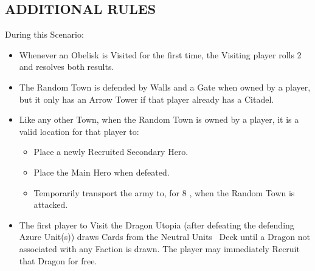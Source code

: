 \begin{multicols}{2}
\subsection*{\MakeUppercase{Additional Rules}}
During this Scenario:
\begin{itemize}
  \item Whenever an Obelisk is Visited for the first time, the Visiting player rolls 2  and resolves both results.
  \item The Random Town is defended by Walls and a Gate when owned by a player, but it only has an Arrow Tower if that player already has a Citadel.
  \item Like any other Town, when the Random Town is owned by a player, it is a valid location for that player to:
    \begin{itemize}
      \item Place a newly Recruited Secondary Hero.
      \item Place the Main Hero when defeated.
      \item Temporarily transport the army to, for 8 , when the Random Town is attacked.
    \end{itemize}
  \item The first player to Visit the Dragon Utopia (after defeating the defending Azure Unit(s)) draws Cards from the Neutral Units \azure\ Deck until a Dragon not associated with any Faction is drawn.
    The player may immediately Recruit that Dragon for free.
\end{itemize}

\columnbreak

\phantom{.}
\vfill
\begin{center}
\end{center}
\vfill
\phantom{.}
\end{multicols}


